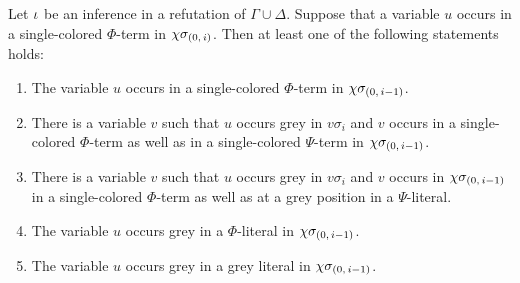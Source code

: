 \documentclass[,%
	draft=false,%
	numbers=noendperiod
	12pt,
	a4paper,
	oneside,%
	openany,
]{memoir}
\begin{document}
\begin{lemma}
	\label{lemma:var_in_sc_term}
	Let $\iota$ be an inference in a refutation of $\Gamma\cup\Delta$.
	Suppose that a variable $u$ occurs in a single-colored $\Phi$-term in $\chi\sigma_{(0,\,i)}$.
	Then at least one of the following statements holds:
	\begin{enumerate}
		\item
			\label{15_1}
			The variable $u$ occurs in a single-colored $\Phi$-term in $\chi\sigma_{(0,\,i-1)}$.

		\item
			\label{15_2}
			There is a variable $v$ such that $u$ occurs grey in $v\sigma_i$ and $v$ occurs in a single-colored $\Phi$-term as well as in a single-colored $\Psi$-term in $\chi\sigma_{(0,\,i-1)}$.


		\item
			\label{15_4}
			There is a variable $v$ such that $u$ occurs grey in $v\sigma_i$ and $v$ occurs in $\chi\sigma_{(0,\,i-1)}$ in a single-colored $\Phi$-term as well as at a grey position in a $\Psi$-literal.

		\item
			\label{15_3}
			The variable $u$ occurs grey in a $\Phi$-literal in $\chi\sigma_{(0,\,i-1)}$.

		\item
			\label{15_5}
			The variable $u$ occurs grey in a grey literal in $\chi\sigma_{(0,\,i-1)}$.

	\end{enumerate}
\end{lemma}
\end{document}
